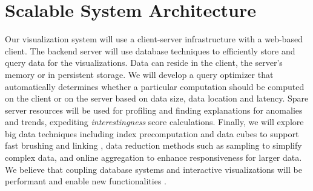 \section*{Scalable System Architecture}

Our visualization system will use a client-server infrastructure with a web-based client. The backend server will use database techniques to efficiently store and query data for the visualizations. Data can reside in the client, the server's memory or in persistent storage.  We will develop a query optimizer that automatically determines whether a particular computation should be computed on the client or on the server based on data size, data location and latency.
Spare server resources will be used for profiling and finding explanations for anomalies and trends, expediting \textit{interestingness} score calculations.
Finally, we will explore big data techniques including index precomputation and data cubes to support fast brushing and linking \cite{liu:immens, lins:nanocubes}, data reduction methods such as sampling to simplify complex data, and online aggregation \cite{hellerstein:onlineagg, agarwal:blinkdb, fisher:trustme} to enhance responsiveness for larger data. We believe that coupling database systems and interactive visualizations will be performant and enable new functionalities \cite{wu:dvms}.
